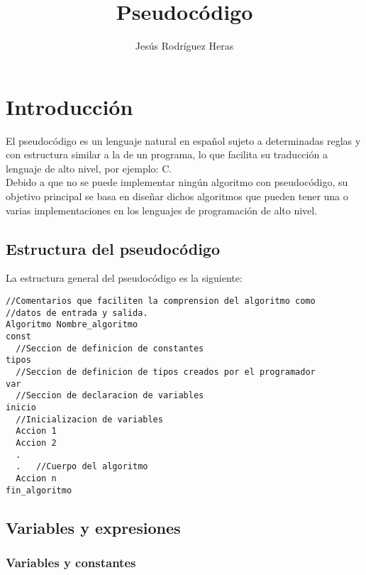 \documentclass[12pt,letterpaper]{article}
\title{Pseudocódigo}
\author{Jesús Rodríguez Heras}
\begin{document}
\maketitle
\thispagestyle{empty}
\newpage

\tableofcontents
\newpage




\lstset{language=bash, numbers=left, numberstyle=\tiny, numbersep=10pt, firstnumber=1, stepnumber=1}

\section{Introducción}

El pseudocódigo es un lenguaje natural en español sujeto a determinadas reglas y con estructura similar a la de un programa, lo que facilita su traducción a lenguaje de alto nivel, por ejemplo: C.\\
Debido a que no se puede implementar ningún algoritmo con pseudocódigo, su objetivo principal se basa en diseñar dichos algoritmos que pueden tener una o varias implementaciones en los lenguajes de programación de alto nivel.

\subsection{Estructura del pseudocódigo}

La estructura general del pseudocódigo es la siguiente:
\begin{lstlisting}
//Comentarios que faciliten la comprension del algoritmo como
//datos de entrada y salida.
Algoritmo Nombre_algoritmo
const
  //Seccion de definicion de constantes
tipos
  //Seccion de definicion de tipos creados por el programador
var
  //Seccion de declaracion de variables
inicio
  //Inicializacion de variables
  Accion 1
  Accion 2
  .
  .   //Cuerpo del algoritmo
  Accion n
fin_algoritmo
\end{lstlisting}

\subsection{Variables y expresiones}
\subsubsection{Variables y constantes}
\end{document}
